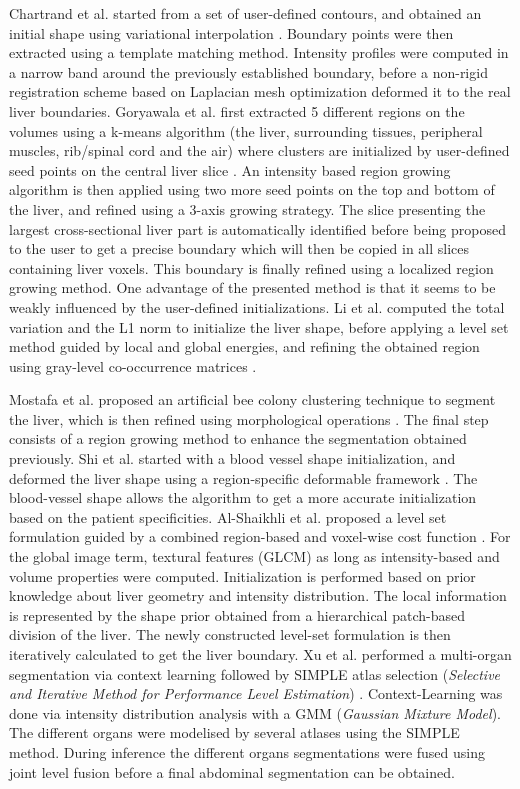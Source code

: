 \documentclass[]{article}
\begin{document}
	Chartrand et al. started from a set of user-defined contours, and obtained an
	initial shape using variational interpolation \cite{Chatrand2014}. Boundary points were then
	extracted using a template matching method. Intensity profiles were
	computed in a narrow band around the previously established boundary,
	before a non-rigid registration scheme based on Laplacian mesh
	optimization deformed it to the real liver boundaries.
	Goryawala et al. first extracted 5 different regions on the volumes using
	a k-means algorithm (the liver, surrounding tissues, peripheral muscles,
	rib/spinal cord and the air) where clusters are initialized by
	user-defined seed points on the central liver slice \cite{Goryawala2014}. An intensity based
	region growing algorithm is then applied using two more seed points on
	the top and bottom of the liver, and refined using a 3-axis growing
	strategy. The slice presenting the largest cross-sectional liver part is
	automatically identified before being proposed to the user to get a
	precise boundary which will then be copied in all slices containing
	liver voxels. This boundary is finally refined using a localized region
	growing method. One advantage of the presented method is that it seems
	to be weakly influenced by the user-defined initializations. Li et al. computed the total variation and the L1 norm to initialize the
	liver shape, before applying a level set method guided by local and
	global energies, and refining the obtained region using gray-level
	co-occurrence matrices \cite{Li2014b}.
	
	Mostafa et al. proposed an artificial bee colony clustering technique to
	segment the liver, which is then refined using morphological operations \cite{Mostofa2015}.
	The final step consists of a region growing method to enhance the
	segmentation obtained previously.
	Shi et al. started with a blood vessel shape initialization, and deformed
	the liver shape using a region-specific deformable framework \cite{Shi2015}. The
	blood-vessel shape allows the algorithm to get a more accurate
	initialization based on the patient specificities. Al-Shaikhli et al. proposed a level set formulation guided by a combined region-based and
	voxel-wise cost function \cite{Al-Shaikhli2015}. For the global image term, textural features
	(GLCM) as long as intensity-based and volume properties were computed.
	Initialization is performed based on prior knowledge about liver
	geometry and intensity distribution. The local information is
	represented by the shape prior obtained from a hierarchical patch-based
	division of the liver. The newly constructed level-set formulation is
	then iteratively calculated to get the liver boundary.
	Xu et al. performed a multi-organ segmentation via context learning
	followed by SIMPLE atlas selection (\emph{Selective and Iterative Method
		for Performance Level Estimation}) \cite{Xu2015}. Context-Learning was done via
	intensity distribution analysis with a GMM (\emph{Gaussian Mixture
		Model}). The different organs were modelised by several atlases using
	the SIMPLE method. During inference the different organs segmentations
	were fused using joint level fusion before a final abdominal
	segmentation can be obtained.
	
\end{document}
